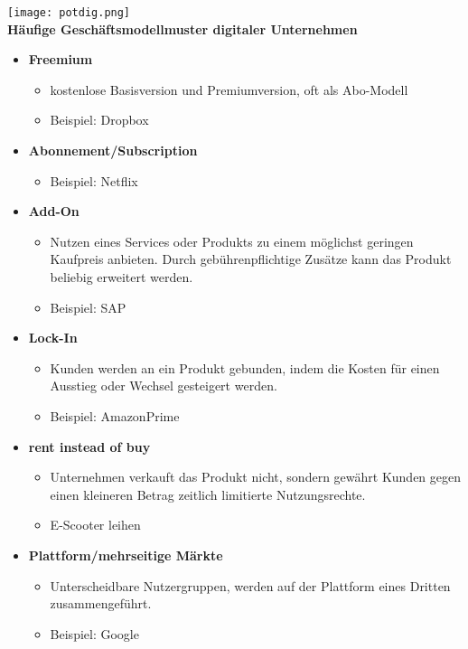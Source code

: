 \documentclass[a4]{scrartcl}
\begin{document}
\texttt{[image: potdig.png]}
\\

\textbf{Häufige Geschäftsmodellmuster digitaler Unternehmen}

\begin{itemize}
\item \textbf{Freemium}
\begin{itemize}
\item kostenlose Basisversion und Premiumversion, oft als Abo-Modell
\item Beispiel: Dropbox
\end{itemize}
\item \textbf{Abonnement/Subscription}
\begin{itemize}
\item Beispiel: Netflix
\end{itemize}
\item \textbf{Add-On}
\begin{itemize}
\item Nutzen eines Services oder Produkts zu einem möglichst geringen Kaufpreis anbieten. Durch gebührenpflichtige Zusätze kann das Produkt beliebig erweitert werden. 
\item Beispiel: SAP
\end{itemize}
\item \textbf{Lock-In}
\begin{itemize}
\item Kunden werden an ein Produkt gebunden, indem die Kosten für einen Ausstieg oder Wechsel gesteigert werden.
\item Beispiel: AmazonPrime
\end{itemize}
\item \textbf{rent instead of buy}
\begin{itemize}
\item Unternehmen verkauft das Produkt nicht, sondern gewährt Kunden gegen einen kleineren Betrag zeitlich limitierte Nutzungsrechte.
\item E-Scooter leihen
\end{itemize}
\item \textbf{Plattform/mehrseitige Märkte}
\begin{itemize}
\item Unterscheidbare Nutzergruppen, werden auf der Plattform eines Dritten zusammengeführt.
\item Beispiel: Google
\end{itemize}
\end{itemize}
\end{document}
